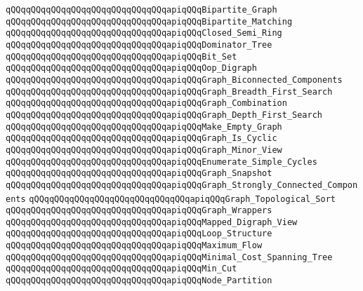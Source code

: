 \verb|qQQqqQQqqQQqqQQqqQQqqQQqqQQqqQQqapiqQQqBipartite_Graph|\newline
\verb|qQQqqQQqqQQqqQQqqQQqqQQqqQQqqQQqapiqQQqBipartite_Matching|\newline
\verb|qQQqqQQqqQQqqQQqqQQqqQQqqQQqqQQqapiqQQqClosed_Semi_Ring|\newline
\verb|qQQqqQQqqQQqqQQqqQQqqQQqqQQqqQQqapiqQQqDominator_Tree|\newline
\verb|qQQqqQQqqQQqqQQqqQQqqQQqqQQqqQQqapiqQQqBit_Set|\newline
\verb|qQQqqQQqqQQqqQQqqQQqqQQqqQQqqQQqapiqQQqOop_Digraph|\newline
\verb|qQQqqQQqqQQqqQQqqQQqqQQqqQQqqQQqapiqQQqGraph_Biconnected_Components|\newline
\verb|qQQqqQQqqQQqqQQqqQQqqQQqqQQqqQQqapiqQQqGraph_Breadth_First_Search|\newline
\verb|qQQqqQQqqQQqqQQqqQQqqQQqqQQqqQQqapiqQQqGraph_Combination|\newline
\verb|qQQqqQQqqQQqqQQqqQQqqQQqqQQqqQQqapiqQQqGraph_Depth_First_Search|\newline
\verb|qQQqqQQqqQQqqQQqqQQqqQQqqQQqqQQqapiqQQqMake_Empty_Graph|\newline
\verb|qQQqqQQqqQQqqQQqqQQqqQQqqQQqqQQqapiqQQqGraph_Is_Cyclic|\newline
\verb|qQQqqQQqqQQqqQQqqQQqqQQqqQQqqQQqapiqQQqGraph_Minor_View|\newline
\verb|qQQqqQQqqQQqqQQqqQQqqQQqqQQqqQQqapiqQQqEnumerate_Simple_Cycles|\newline
\verb|qQQqqQQqqQQqqQQqqQQqqQQqqQQqqQQqapiqQQqGraph_Snapshot|\newline
\verb|qQQqqQQqqQQqqQQqqQQqqQQqqQQqqQQqapiqQQqGraph_Strongly_Connected_Components|\newline
\verb|qQQqqQQqqQQqqQQqqQQqqQQqqQQqqQQqapiqQQqGraph_Topological_Sort|\newline
\verb|qQQqqQQqqQQqqQQqqQQqqQQqqQQqqQQqapiqQQqGraph_Wrappers|\newline
\verb|qQQqqQQqqQQqqQQqqQQqqQQqqQQqqQQqapiqQQqMapped_Digraph_View|\newline
\verb|qQQqqQQqqQQqqQQqqQQqqQQqqQQqqQQqapiqQQqLoop_Structure|\newline
\verb|qQQqqQQqqQQqqQQqqQQqqQQqqQQqqQQqapiqQQqMaximum_Flow|\newline
\verb|qQQqqQQqqQQqqQQqqQQqqQQqqQQqqQQqapiqQQqMinimal_Cost_Spanning_Tree|\newline
\verb|qQQqqQQqqQQqqQQqqQQqqQQqqQQqqQQqapiqQQqMin_Cut|\newline
\verb|qQQqqQQqqQQqqQQqqQQqqQQqqQQqqQQqapiqQQqNode_Partition|\newline
